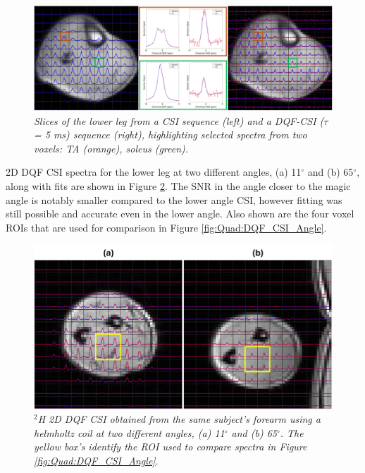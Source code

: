 \begin{figure}
    \centering
    \includegraphics[width=1\textwidth]{Figures/Quad/SQFDQF_CSI_2.png}
    \caption{\textit{Slices of the lower leg from a \ac{CSI} sequence (left) and a \ac{DQF}-\ac{CSI} ($\tau$ = 5 ms) sequence (right), highlighting selected spectra from two voxels: \ac{TA} (orange), soleus (green).}}
    \label{fig:Quad:SQFDQF_2}
\end{figure}

2D \ac{DQF} \ac{CSI} spectra for the lower leg at two different angles, (a) 11$^\circ$ and (b) 65$^\circ$, along with fits are shown in Figure \ref{fig:Quad:Arm_DQF}. The \ac{SNR} in the angle closer to the magic angle is notably smaller compared to the lower angle \ac{CSI}, however fitting was still possible and accurate even in the lower angle. Also shown are the four voxel \ac{ROI}s that are used for comparison in Figure \ref{fig:Quad:DQF_CSI_Angle}.

\begin{figure}
    \centering
    \includegraphics[width=1\textwidth]{Figures/Quad/Arm_DQF.png}
    \caption{\textit{$^2$H 2D \ac{DQF} \ac{CSI} obtained from the same subject's forearm using a helmholtz coil at two different angles, (a) 11$^\circ$ and (b) 65$^\circ$. The yellow box's identify the \ac{ROI} used to compare spectra in Figure \ref{fig:Quad:DQF_CSI_Angle}}.}
    \label{fig:Quad:Arm_DQF}
\end{figure}

